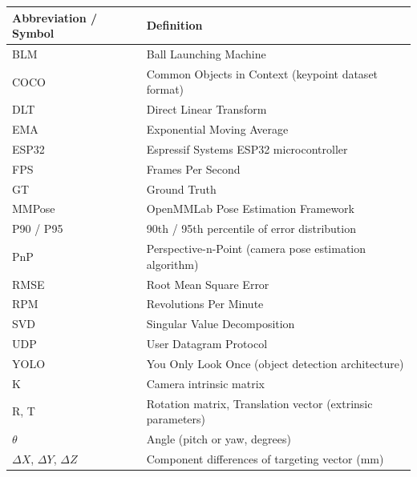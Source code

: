 
\begin{longtable}{|p{3.5cm}|p{9cm}|}
\hline
\textbf{Abbreviation / Symbol} & \textbf{Definition} \\
\hline
\endhead
\hline
\endfoot
BLM & Ball Launching Machine \\
\hline
COCO & Common Objects in Context (keypoint dataset format) \\
\hline
DLT & Direct Linear Transform \\
\hline
EMA & Exponential Moving Average \\
\hline
ESP32 & Espressif Systems ESP32 microcontroller \\
\hline
FPS & Frames Per Second \\
\hline
GT & Ground Truth \\
\hline
MMPose & OpenMMLab Pose Estimation Framework \\
\hline
P90 / P95 & 90th / 95th percentile of error distribution \\
\hline
PnP & Perspective-n-Point (camera pose estimation algorithm) \\
\hline
RMSE & Root Mean Square Error \\
\hline
RPM & Revolutions Per Minute \\
\hline
SVD & Singular Value Decomposition \\
\hline
UDP & User Datagram Protocol \\
\hline
YOLO & You Only Look Once (object detection architecture) \\
\hline
K & Camera intrinsic matrix \\
\hline
R, T & Rotation matrix, Translation vector (extrinsic parameters) \\
\hline
$\theta$ & Angle (pitch or yaw, degrees) \\
\hline
$\Delta X$, $\Delta Y$, $\Delta Z$ & Component differences of targeting vector (mm) \\
\hline
\end{longtable}
